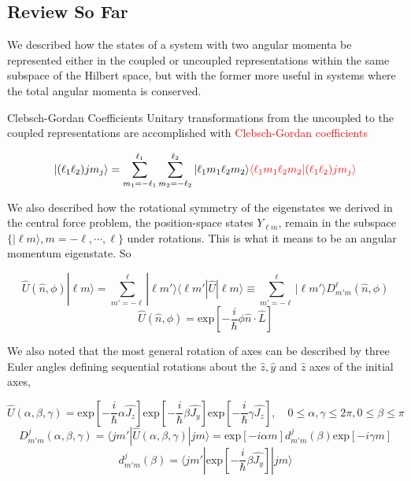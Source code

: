 \subsection{Review So Far}


We described how the states of a system with two angular momenta be represented
either in the coupled or uncoupled representations within the same subspace of
the Hilbert space, but with the former more useful in systems where the total
angular momenta is conserved. 

\begin{subbox}{Clebsch-Gordan Coefficients}
  Unitary transformations from the uncoupled to the coupled representations are
  accomplished with \textcolor{red}{Clebsch-Gordan coefficients} 

  \[ |(\ell_1\ell_2) jm_j \rangle = \sum_{m_1 = -\ell_1}^{\ell_1} \sum_{m_2
    = -\ell_2}^{\ell_2} |\ell_1m_1\ell_2m_2\rangle \textcolor{red}{\langle
  \ell_1m_1\ell_2m_2|(\ell_1\ell_2) jm_j\rangle} \]
\end{subbox}

We also described how the rotational symmetry of the eigenstates we derived in
the central force problem, the position-space states $Y_{\ell m}$, remain in
the subspace $\{ |\ell m\rangle, m = - \ell, \cdots, \ell\}$ under rotations.
This is what it means to be an angular momentum eigenstate. So 

\begin{mainbox}{}
  \[ \hat{U}(\hat{n}, \phi) | \ell m \rangle = \sum_{m' = -\ell}^{\ell} |\ell
    m' \rangle \langle \ell m' | \hat{U} | \ell m \rangle \equiv \sum_{m'
  = -\ell}^{\ell}  |\ell m' \rangle D_{m'm}^\ell (\hat{n}, \phi) \] 
  \[ \hat{U}(\hat{n}, \phi) = \text{exp} \left[ -\frac{i}{\hbar} \phi \hat{n}
  \cdot \hat{L} \right] \] 
\end{mainbox}

We also noted that the most general rotation of axes can be described by three
Euler angles defining sequential rotations about the $\hat{z}, \hat{y}$ and
$\hat{z}$ axes of the initial axes, 

\begin{subbox}{}
   \[
    \hat{U}(\alpha, \beta, \gamma) = \text{exp} \left[ -\frac{i}{\hbar} \alpha
    \hat{J_z}\right] \text{exp}  \left[ -\frac{i}{\hbar}\beta \hat{J_y}\right]
    \text{exp} \left[ -\frac{i}{\hbar} \gamma \hat{J_z}\right], \quad 0 \leq
    \alpha, \gamma \leq 2\pi, 0 \leq \beta \leq \pi
    \] \vspace{3px}
    \[
      D_{m'm}^j (\alpha, \beta, \gamma) = \langle jm' | \hat{U}(\alpha, \beta,
      \gamma) | jm \rangle = \text{exp}  [ -i\alpha m] d_{m'm}^j (\beta)
      \text{exp} [-i\gamma m]
    \] \vspace{3px}
    \[
      d_{m'm}^j(\beta) = \langle jm' | \text{exp} \left[ -\frac{i}{\hbar} \beta
      \hat{J_y} \right] | jm\rangle
    \] 
\end{subbox}


